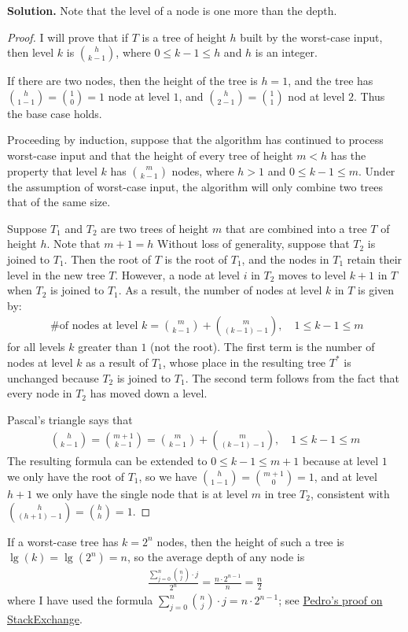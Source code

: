 \documentclass[12pt, a4paper]{article}
\newenvironment{sol}[1][Solution]
{\par\medskip\noindent \textbf{#1.} }
{\medskip}
\begin{document}
	\begin{sol}
		Note that the level of a node is one more than the depth.
		
		\begin{proof}
			I will prove that if $T$ is a tree of height $h$ built by the worst-case input,
			then level $k$ is $\binom{h}{k-1}$, where $0\leq k-1\leq h$ and $h$ is an integer.
			
			If there are two nodes, then the height of the tree is $h=1$, 
			and the tree has $\binom{h}{1-1}=\binom{1}{0}=1$ node at level $1$, and
			$\binom{h}{2-1}=\binom{1}{1}$ nod at level $2$. Thus the base case holds.
			
			Proceeding by induction, suppose that the algorithm has continued to process
			worst-case input and that the height of every tree of height $m < h$
			has the property that level $k$ has $\binom{m}{k-1}$ nodes, where $h>1$
			and $0\leq k-1\leq m$. Under the assumption of worst-case input, the algorithm
			will only combine two trees that of the same size.
			
			Suppose $T_1$ and $T_2$ are two trees of height $m$ that are combined into a tree
			$T$ of height $h$. Note that $m + 1=h$
			Without loss of generality, suppose that $T_2$ is joined to $T_1$.
			Then the root of $T$ is the root of $T_1$, and the nodes in $T_1$ retain
			their level in the new tree $T$. However, a node at level $i$ in $T_2$
			moves to level $k+1$ in $T$ when $T_2$ is joined to $T_1$. As a result,
			the number of nodes at level $k$ in $T$ is given by:
			\begin{align*}
				\text{ \# of nodes at level $k$} = \binom{m}{k-1} + \binom{m}{(k-1) -1},\quad 1\leq k-1\leq m
			\end{align*}
			for all levels $k$ greater than $1$ (not the root). The first term is
			the number of nodes at level $k$ as a result of $T_1$, whose place in the
			resulting tree $T^*$ is unchanged because $T_2$ is joined to $T_1$.
			The second term follows from the fact that every node in $T_2$ has moved
			down a level.
			
			Pascal's triangle says that
			\begin{align*}
				\binom{h}{k-1}=\binom{m+1}{k-1} = \binom{m}{k-1}+\binom{m}{(k-1)-1},\quad 1\leq k-1\leq m
			\end{align*}
			The resulting formula can be extended to $0\leq k-1\leq m+1$ because at level
			$1$ we only have the root of $T_1$, so we have $\binom{h}{1-1}=\binom{m+1}{0}=1$,
			and at level $h+1$ we only have the single node that is at level $m$ in tree $T_2$,
			consistent with $\binom{h}{(h+1)-1}=\binom{h}{h}=1$.
		\end{proof}
		
		If a worst-case tree has $k=2^n$ nodes, then the height of such a tree is $\lg(k)=\lg(2^n)=n$,
		so the average depth of any node is
		\begin{align*}
			\frac{\sum_{j=0}^{n}\binom{n}{j}\cdot j}{2^n} = \frac{n\cdot 2^{n-1}}{n}=\frac{n}{2}
		\end{align*}
		where I have used the formula $\sum_{j=0}^{n}\binom{n}{j}\cdot j=n\cdot 2^{n-1}$;
		see \href{https://math.stackexchange.com/a/123665}{Pedro's proof on StackExchange}.
	\end{sol}
\end{document}
